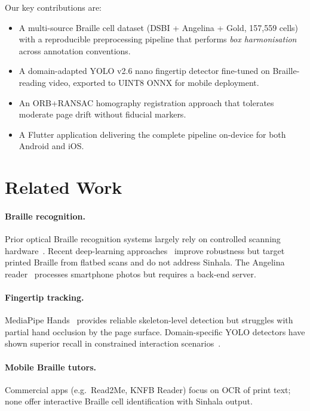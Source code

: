 \documentclass{article}
\begin{document}
Our key contributions are:
\begin{itemize}
  \item A multi-source Braille cell dataset (DSBI + Angelina + Gold,
    157,559 cells) with a reproducible preprocessing pipeline that performs
    \emph{box harmonisation} across annotation conventions.
  \item A domain-adapted YOLO v2.6 nano fingertip detector fine-tuned on
    Braille-reading video, exported to UINT8 ONNX for mobile deployment.
  \item An ORB+RANSAC homography registration approach that tolerates
    moderate page drift without fiducial markers.
  \item A Flutter application delivering the complete pipeline on-device
    for both Android and iOS.
\end{itemize}

\section{Related Work}

\paragraph{Braille recognition.} Prior optical Braille recognition systems
largely rely on controlled scanning hardware~\cite{antonacopoulos1998}.
Recent deep-learning approaches~\cite{ovodov2021} improve robustness but
target printed Braille from flatbed scans and do not address Sinhala.
The Angelina reader~\cite{angel2021} processes smartphone photos but
requires a back-end server.

\paragraph{Fingertip tracking.} MediaPipe Hands~\cite{zhang2020} provides
reliable skeleton-level detection but struggles with partial hand occlusion
by the page surface.  Domain-specific YOLO detectors have shown superior
recall in constrained interaction scenarios~\cite{redmon2016}.

\paragraph{Mobile Braille tutors.} Commercial apps (e.g.\ Read2Me, KNFB
Reader) focus on OCR of print text; none offer interactive Braille cell
identification with Sinhala output.
\end{document}
